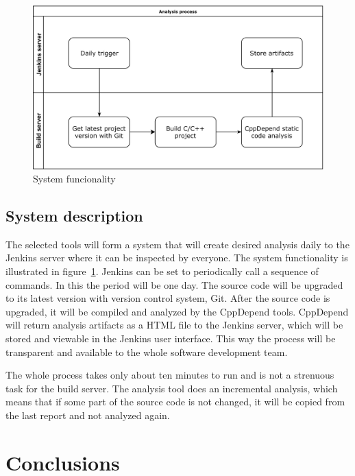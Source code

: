 \begin{figure}[t!]
\centering
\includegraphics[scale=0.06]{systemdesc.png}
\caption{System funcionality}
\label{fig:systemdesc}
\end{figure}

\section{System description}

The selected tools will form a system that will create desired analysis daily to the Jenkins server where it can be inspected by everyone. The system functionality is illustrated in figure~\ref{fig:systemdesc}. Jenkins can be set to periodically call a sequence of commands. In this the period will be one day. The source code will be upgraded to its latest version with version control system, Git. After the source code is upgraded, it will be compiled and analyzed by the CppDepend tools. CppDepend will return analysis artifacts as a HTML file to the Jenkins server, which will be stored and viewable in the Jenkins user interface.
This way the process will be transparent and available to the whole software development team.

The whole process takes only about ten minutes to run and is not a strenuous task for the build server. The analysis tool does an incremental analysis, which means that if some part of the source code is not changed, it will be copied from the last report and not analyzed again. 





\chapter{Conclusions}

